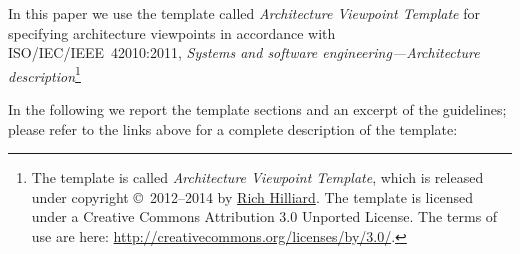 


%

In this paper we use the template called \textit{Architecture Viewpoint Template} for specifying architecture viewpoints in
  accordance with ISO/IEC/IEEE~42010:2011, \textit{Systems and
    software engineering---Architecture description}\footnote{The template is called \textit{Architecture Viewpoint Template}, which is released under copyright \copyright\
2012--2014 by \href{http://www.iso-architecture.org/42010/templates/}%
{Rich Hilliard}. 
The template is licensed under a
Creative Commons Attribution 3.0 Unported License. The terms of use
are here: 
\url{http://creativecommons.org/licenses/by/3.0/}.}   


%

%
In the following we report the template sections and an excerpt of the guidelines; please refer to the links above for a complete description of the template: 

